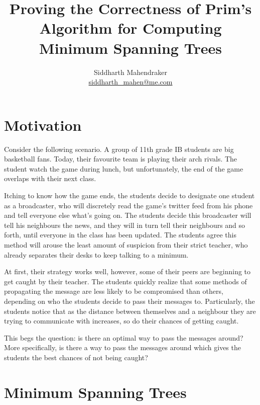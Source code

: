 \documentclass[a4paper,11pt]{report}
\theoremstyle{plain}
\theoremstyle{definition}
\begin{document}
\title{Proving the Correctness of Prim's Algorithm for Computing
Minimum Spanning Trees}
\author{Siddharth Mahendraker\\
    \url{siddharth\_mahen@me.com}}
\maketitle

\setcounter{page}{1}
\tableofcontents
\clearpage
\setcounter{page}{1}


\section{Motivation}

Consider the following scenario. A group of 11th grade IB students are big
basketball fans. Today, their favourite team is playing their arch rivals.
The student watch the game during lunch, but unfortunately, the end of the
game overlaps with their next class.

Itching to know how the game ends, the students decide to designate one
student as a broadcaster, who will discretely read the game's twitter
feed from his phone and tell everyone else what's going on. The students
decide this broadcaster will tell his neighbours the news, and they will in
turn tell their neighbours and so forth, until everyone in the class has
been updated. The students agree this method will arouse the least amount
of suspicion from their strict teacher, who already separates their desks
to keep talking to a minimum.

At first, their strategy works well, however, some of their peers are
beginning to get caught by their teacher. The students quickly realize
that some methods of propagating the message are less likely to be
compromised than others, depending on who the students decide to pass
their messages to. Particularly, the students notice that as the distance
between themselves and a neighbour they are trying to communicate with
increases, so do their chances of getting caught.

This begs the question: is there an optimal way to pass the messages around?
More specifically, is there a way to pass the messages around which gives
the students the best chances of not being caught?

\section{Minimum Spanning Trees}
\end{document}
